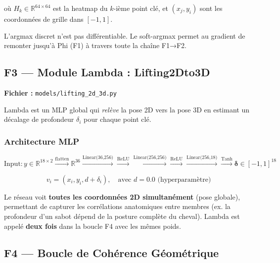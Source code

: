 \documentclass[12pt,a4paper]{article}
\begin{document}
où $H_k \in \mathbb{R}^{64 \times 64}$ est la heatmap du $k$-ième point clé,
et $(x_j, y_i)$ sont les coordonnées de grille dans $[-1,1]$.

\begin{warnbox}
  L'argmax discret n'est pas différentiable. Le soft-argmax permet au gradient
  de remonter jusqu'à Phi (F1) à travers toute la chaîne F1→F2.
\end{warnbox}

\subsection{F3 --- Module Lambda : Lifting2Dto3D}
\label{sec:lambda}

\textbf{Fichier :} \texttt{models/lifting\_2d\_3d.py}

Lambda est un MLP global qui \emph{relève} la pose 2D vers la pose 3D en estimant
un décalage de profondeur $\delta_i$ pour chaque point clé.

\subsubsection*{Architecture MLP}

\begin{equation}
  \text{Input} : y \in \mathbb{R}^{18 \times 2} \xrightarrow{\text{flatten}} \mathbb{R}^{36}
  \xrightarrow{\text{Linear(36,256)}} \xrightarrow{\text{ReLU}} \xrightarrow{\text{Linear(256,256)}}
  \xrightarrow{\text{ReLU}} \xrightarrow{\text{Linear(256,18)}} \xrightarrow{\text{Tanh}}
  \bm{\delta} \in [-1,1]^{18}
\end{equation}

\begin{equation}
  v_i = (x_i, y_i, d + \delta_i), \quad \text{avec } d = 0.0 \text{ (hyperparamètre)}
\end{equation}

\begin{infobox}
  Le réseau voit \textbf{toutes les coordonnées 2D simultanément} (pose globale),
  permettant de capturer les corrélations anatomiques entre membres
  (ex. la profondeur d'un sabot dépend de la posture complète du cheval).
  Lambda est appelé \textbf{deux fois} dans la boucle F4 avec les mêmes poids.
\end{infobox}

\subsection{F4 --- Boucle de Cohérence Géométrique}
\label{sec:geo}
\end{document}
